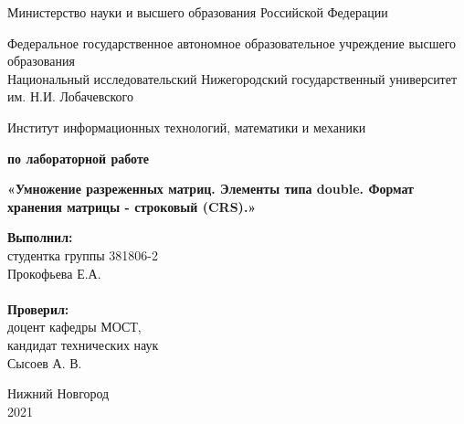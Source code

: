 \documentclass{report}
\begin{document}
\begin{titlepage}

\begin{center}
Министерство науки и высшего образования Российской Федерации
\end{center}

\begin{center}
Федеральное государственное автономное образовательное учреждение высшего образования \\
Национальный исследовательский Нижегородский государственный университет им. Н.И. Лобачевского
\end{center}

\begin{center}
Институт информационных технологий, математики и механики
\end{center}

\vspace{4em}

\begin{center}
\textbf{ по лабораторной работе} \\
\end{center}
\begin{center}
\textbf{\Large«Умножение разреженных матриц. Элементы типа double. Формат хранения матрицы - строковый (CRS).»} \\
\end{center}

\vspace{4em}

\newbox{\lbox}
\newlength{\maxl}
\setlength{\maxl}{\wd\lbox}
\hfill\parbox{7cm}{
\hspace*{5cm}\hspace*{-5cm}\textbf{Выполнил:} \\ студентка группы 381806-2 \\ Прокофьева Е.А.\\
\\
\hspace*{5cm}\hspace*{-5cm}\textbf{Проверил:}\\ доцент кафедры МОСТ, \\ кандидат технических наук \\ Сысоев А. В.\\
}
\vspace{\fill}

\begin{center} Нижний Новгород \\ 2021 \end{center}

\end{titlepage}
\end{document}
